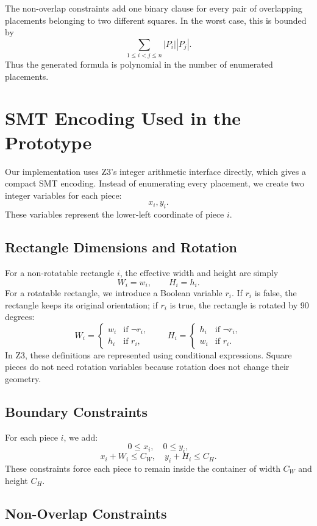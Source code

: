 \documentclass[11pt]{article}
\begin{document}
The non-overlap constraints add one binary clause for every pair of
overlapping placements belonging to two different squares. In the worst case,
this is bounded by
\[
\sum_{1 \leq i < j \leq n} |P_i||P_j|.
\]
Thus the generated formula is polynomial in the number of enumerated
placements.

\section{SMT Encoding Used in the Prototype}

Our implementation uses Z3's integer arithmetic interface directly, which gives
a compact SMT encoding. Instead of enumerating every placement, we create two
integer variables for each piece:
\[
x_i, y_i.
\]
These variables represent the lower-left coordinate of piece \(i\).

\subsection{Rectangle Dimensions and Rotation}

For a non-rotatable rectangle \(i\), the effective width and height are simply
\[
W_i = w_i,\qquad H_i = h_i.
\]
For a rotatable rectangle, we introduce a Boolean variable \(r_i\). If \(r_i\)
is false, the rectangle keeps its original orientation; if \(r_i\) is true, the
rectangle is rotated by 90 degrees:
\[
W_i =
\begin{cases}
w_i & \text{if } \neg r_i,\\
h_i & \text{if } r_i,
\end{cases}
\qquad
H_i =
\begin{cases}
h_i & \text{if } \neg r_i,\\
w_i & \text{if } r_i.
\end{cases}
\]
In Z3, these definitions are represented using conditional expressions. Square
pieces do not need rotation variables because rotation does not change their
geometry.

\subsection{Boundary Constraints}

For each piece \(i\), we add:
\[
0 \leq x_i,\quad 0 \leq y_i,
\]
\[
x_i + W_i \leq C_W,\quad y_i + H_i \leq C_H.
\]
These constraints force each piece to remain inside the container of width
\(C_W\) and height \(C_H\).

\subsection{Non-Overlap Constraints}
\end{document}
